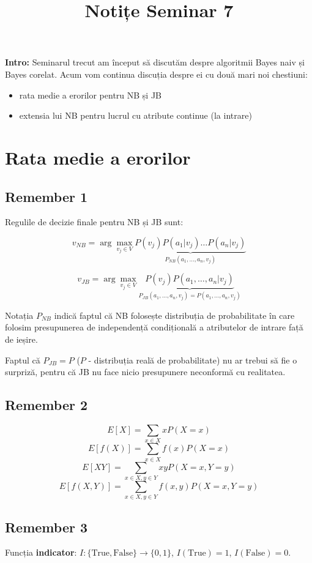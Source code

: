 \documentclass[12pt]{article}
\title{%
	\textbf{Notițe Seminar 7}}
\begin{document}
	
	\maketitle
	
	\textbf{{Intro:}} Seminarul trecut am început să discutăm despre algoritmii Bayes naiv și Bayes corelat. Acum vom continua discuția despre ei cu două mari noi chestiuni:
	\begin{itemize}
		\item 	rata medie a erorilor pentru NB și JB
		\item 	extensia lui NB pentru lucrul cu atribute continue (la intrare)
	\end{itemize}

	\section{Rata medie a erorilor}
	\subsection{Remember 1}
	
	Regulile de decizie finale pentru NB și JB sunt:
	
	$$v_{NB} = \arg \max_{v_j \in V} \underbrace{P(v_j) P(a_1|v_j) \dots P(a_n|v_j)}_{P_{NB}(a_1,\dots,a_n,v_j)}$$
	
	$$v_{JB} = \arg \max_{v_j \in V} \underbrace{P(v_j) P(a_1,\dots,a_n|v_j)}_{P_{JB}(a_1,\dots,a_n,v_j) = P(a_1,\dots,a_n,v_j)}$$
	
	Notația $P_{NB}$ indică faptul că NB folosește distribuția de probabilitate în care folosim presupunerea de independență condițională a atributelor de intrare față de ieșire.
	
	Faptul că $P_{JB} = P$ ($P$ - distribuția reală de probabilitate) nu ar trebui să fie o surpriză, pentru că JB nu face nicio presupunere neconformă cu realitatea.
	
	\subsection{Remember 2}
	$$E[X] = \sum_{x \in X} x P(X = x)$$
	$$E[f(X)] = \sum_{x \in X} f(x) P(X = x)$$
	$$E[XY] = \sum_{x \in X, y\in Y} xy P(X = x, Y = y)$$
	$$E[f(X,Y)] = \sum_{x \in X, y\in Y} f(x,y) P(X = x, Y = y)$$
	
	\subsection{Remember 3}
	Funcția \textbf{indicator}: $I : \{\text{True},\text{False}\} \rightarrow \{0,1\}$, $I(\text{True}) = 1$, $I(\text{False}) = 0$.
	
\end{document}
